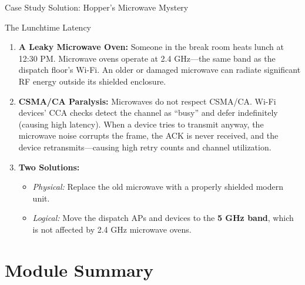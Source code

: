 \documentclass[aspectratio=169]{beamer}
\begin{document}
\begin{frame}{Case Study Solution: Hopper's Microwave Mystery}
    \begin{casesolution}{The Lunchtime Latency}
        \footnotesize
        \begin{enumerate}
            \item \textbf{A Leaky Microwave Oven:} Someone in the break room heats lunch at 12:30 PM. Microwave ovens operate at 2.4 GHz---the same band as the dispatch floor's Wi-Fi. An older or damaged microwave can radiate significant RF energy outside its shielded enclosure.

            \item \textbf{CSMA/CA Paralysis:} Microwaves do not respect CSMA/CA. Wi-Fi devices' CCA checks detect the channel as ``busy'' and defer indefinitely (causing high latency). When a device tries to transmit anyway, the microwave noise corrupts the frame, the ACK is never received, and the device retransmits---causing high retry counts and channel utilization.

            \item \textbf{Two Solutions:}
                \begin{itemize}
                    \item \textit{Physical:} Replace the old microwave with a properly shielded modern unit.
                    \item \textit{Logical:} Move the dispatch APs and devices to the \textbf{5 GHz band}, which is not affected by 2.4 GHz microwave ovens.
                \end{itemize}
        \end{enumerate}
    \end{casesolution}
\end{frame}

\section*{Module Summary}
\end{document}
